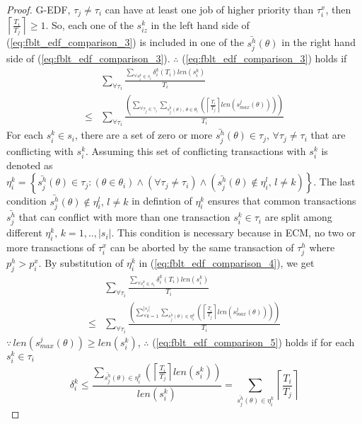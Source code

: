 \documentclass[12pt,english]{report}
\newtheorem{proof}{Proof}
\begin{document}
\begin{proof}
G-EDF, $\tau_{j}\ne\tau_{i}$ can have at least one job of higher
priority than $\tau_{i}^{x}$, then $\left\lceil \frac{T_{i}}{T_{j}}\right\rceil \ge1$.
So, each one of the $s_{iz}^{k}$ in the left hand side of (\ref{eq:fblt_edf_comparison_3})
is included in one of the $\bar{s_{j}^{h}}(\theta)$ in the right hand
side of (\ref{eq:fblt_edf_comparison_3}). $\therefore$ (\ref{eq:fblt_edf_comparison_3})
holds if 
\begin{eqnarray}
 & \sum_{\forall\tau_{i}}\frac{\sum_{\forall s_{i}^{k}\in s_{i}}\delta_{i}^{k}(T_{i})len(s_{i}^{k})}{T_{i}}\label{eq:fblt_edf_comparison_4}\\
\le & \sum_{\forall\tau_{i}}\frac{\left(\sum_{\forall\tau_{j}\in\gamma_{i}}\sum_{\bar{s_{j}^{h}}(\theta),\,\theta\in\theta_{i}}\left(\left\lceil \frac{T_{i}}{T_{j}}\right\rceil len\left(s_{max}^{j}(\theta)\right)\right)\right)}{T_{i}}\nonumber 
\end{eqnarray}
For each $s_{i}^{k}\in s_{i}$, there are a set of zero or more $\bar{s_{j}^{h}}(\theta)\in\tau_{j},\,\forall\tau_{j}\ne\tau_{i}$
that are conflicting with $s_{i}^{k}$. Assuming this set of conflicting
transactions with $s_{i}^{k}$ is denoted as $\eta_{i}^{k}=\left\{ \bar{s_{j}^{h}}(\theta)\in\tau_{j}:\left(\theta\in\theta_{i}\right)\wedge\left(\forall\tau_{j}\ne\tau_{i}\right)\wedge\left(\bar{s_{j}^{h}}(\theta)\not\in\eta_{i}^{l},\, l\ne k\right)\right\} $.
The last condition $\bar{s_{j}^{h}}(\theta)\not\in\eta_{i}^{l},\, l\ne k$
in defintion of $\eta_{i}^{k}$ ensures that common transactions $\bar{s_{j}^{h}}$
that can conflict with more than one transaction $s_{i}^{k}\in\tau_{i}$
are split among different $\eta_{i}^{k},\, k=1,..,|s_{i}|$. This
condition is necessary because in ECM, no two or more transactions
of $\tau_{i}^{x}$ can be aborted by the same transaction of $\tau_{j}^{h}$
where $p_{j}^{h}>p_{i}^{x}$. By substitution of $\eta_{i}^{k}$ in
(\ref{eq:fblt_edf_comparison_4}), we get 
\begin{eqnarray}
 & \sum_{\forall\tau_{i}}\frac{\sum_{\forall s_{i}^{k}\in s_{i}}\delta_{i}^{k}(T_{i})len(s_{i}^{k})}{T_{i}}\label{eq:fblt_edf_comparison_5}\\
\le & \sum_{\forall\tau_{i}}\frac{\left(\sum_{\forall k=1}^{|s_{i}|}\sum_{\bar{s_{j}^{h}}(\theta)\in\eta_{i}^{k}}\left(\left\lceil \frac{T_{i}}{T_{j}}\right\rceil len\left(s_{max}^{j}(\theta)\right)\right)\right)}{T_{i}}\nonumber 
\end{eqnarray}
$\because\, len\left(s_{max}^{j}(\theta)\right)\ge len(s_{i}^{k})$,
$\therefore$ (\ref{eq:fblt_edf_comparison_5}) holds if for each $s_{i}^{k}\in\tau_{i}$
\begin{equation*}
\delta_{i}^{k}\le\frac{\sum_{\bar{s_{j}^{h}}(\theta)\in\eta_{i}^{k}}\left(\left\lceil \frac{T_{i}}{T_{j}}\right\rceil len\left(s_{i}^{k}\right)\right)}{len(s_{i}^{k})}=\sum_{\bar{s_{j}^{h}}(\theta)\in\eta_{i}^{k}}\left\lceil \frac{T_{i}}{T_{j}}\right\rceil
\end{equation*}


\end{proof}
\end{document}

